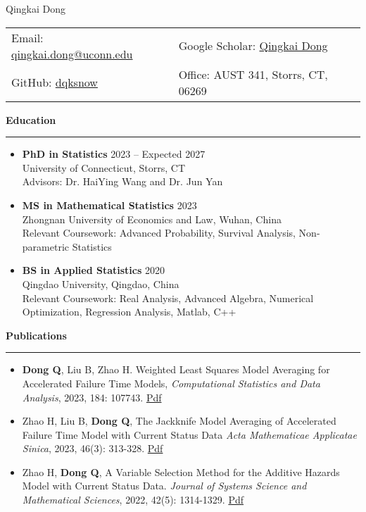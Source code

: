 \documentclass[a4paper,10pt]{article}
\newcommand{\resheading}[1]{
  \vspace{8pt}
  \noindent\textbf{\large #1}
  \vspace{4pt}
  \hrule
  \vspace{8pt}
}
\begin{document}
\begin{center}
    {\LARGE Qingkai Dong} \\
    \vspace{5pt}
    \begin{tabular}{ll}
      Email: \href{mailto:qingkai.dong@uconn.edu}{qingkai.dong@uconn.edu} &  Google Scholar: \href{https://scholar.google.com/citations?user=mojHlF4AAAAJ&hl=en&oi=ao}{Qingkai Dong} \\  GitHub: \href{https://github.com/dqksnow}{dqksnow} 
      &   Office: AUST 341, Storrs, CT, 06269 \\
    \end{tabular}
\end{center}
\resheading{Education}
\begin{itemize}[left=0pt, label={}]
    \item \textbf{PhD in Statistics} \hfill 2023 -- Expected 2027 \\
    University of Connecticut, Storrs, CT \\
    Advisors: Dr. HaiYing Wang and Dr. Jun Yan
    
    \item \textbf{MS in Mathematical Statistics} \hfill 2023 \\
    Zhongnan University of Economics and Law, Wuhan, China \\
    Relevant Coursework: Advanced Probability, Survival Analysis, Non-parametric Statistics
    
    \item \textbf{BS in Applied Statistics} \hfill 2020 \\
    Qingdao University, Qingdao, China \\
    Relevant Coursework: Real Analysis, Advanced Algebra, Numerical
Optimization, Regression Analysis, Matlab, C++
\end{itemize}

\resheading{Publications}
\begin{itemize}[left=0pt, label={}]
\item \textbf{Dong Q}, Liu B, Zhao H. Weighted Least Squares Model Averaging for Accelerated Failure Time Models,  \emph{Computational Statistics and Data Analysis}, 2023, 184: 107743. \href{https://dqksnow.github.io/pdfs/dong2023weighted.pdf}{Pdf}
  
\item Zhao H, Liu B, \textbf{Dong Q}, The Jackknife Model Averaging of Accelerated Failure Time Model with Current Status Data \emph{Acta Mathematicae Applicatae Sinica}, 2023, 46(3): 313-328. \href{https://dqksnow.github.io/pdfs/zhao2023jackknife.pdf}{Pdf}
  
\item Zhao H, \textbf{Dong Q}, A Variable Selection Method for the Additive Hazards Model with Current Status Data. \emph{Journal of Systems Science and Mathematical Sciences}, 2022, 42(5): 1314-1329. \href{https://dqksnow.github.io/pdfs/hui2022variable.pdf}{Pdf}
  
\end{itemize}
\end{document}
